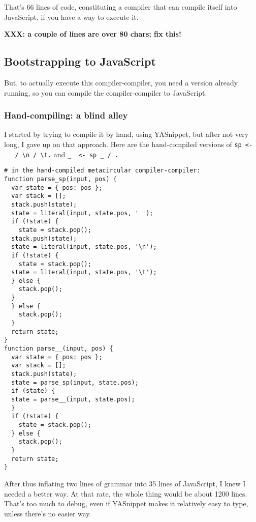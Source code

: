 \documentclass[
]{article}
\begin{document}
That's 66 lines of code, constituting a compiler that can compile itself
into JavaScript, if you have a way to execute it.

\textbf{XXX: a couple of lines are over 80 chars; fix this!}

\hypertarget{bootstrapping-to-javascript}{%
\subsection{Bootstrapping to
JavaScript}\label{bootstrapping-to-javascript}}

But, to actually execute this compiler-compiler, you need a version
already running, so you can compile the compiler-compiler to JavaScript.

\hypertarget{hand-compiling-a-blind-alley}{%
\subsubsection{Hand-compiling: a blind
alley}\label{hand-compiling-a-blind-alley}}

I started by trying to compile it by hand, using YASnippet, but after
not very long, I gave up on that approach. Here are the hand-compiled
versions of
\texttt{sp\ \textless{}-\ \textquotesingle{}\ \textquotesingle{}\ /\ \textquotesingle{}\textbackslash{}n\textquotesingle{}\ /\ \textquotesingle{}\textbackslash{}t\textquotesingle{}.}
and \texttt{\_\ \ \textless{}-\ sp\ \_\ /\ .}

\begin{verbatim}
# in the hand-compiled metacircular compiler-compiler:
function parse_sp(input, pos) {
  var state = { pos: pos };
  var stack = [];
  stack.push(state);
  state = literal(input, state.pos, ' ');
  if (!state) {
    state = stack.pop();
  stack.push(state);
  state = literal(input, state.pos, '\n');
  if (!state) {
    state = stack.pop();
  state = literal(input, state.pos, '\t');
  } else {
    stack.pop();
  }
  } else {
    stack.pop();
  }
  return state;
}
function parse__(input, pos) {
  var state = { pos: pos };
  var stack = [];
  stack.push(state);
  state = parse_sp(input, state.pos);
  if (state) {
  state = parse__(input, state.pos);
  }
  if (!state) {
    state = stack.pop();
  } else {
    stack.pop();
  }
  return state;
}
\end{verbatim}

After thus inflating two lines of grammar into 35 lines of JavaScript, I
knew I needed a better way. At that rate, the whole thing would be about
1200 lines. That's too much to debug, even if YASnippet makes it
relatively easy to type, unless there's no easier way.
\end{document}
